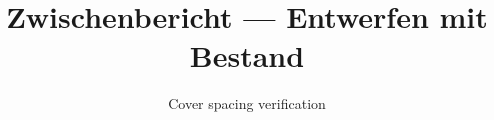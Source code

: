 \documentclass[type=zwischenbericht]{zukunftbau}
\title{Zwischenbericht --- Entwerfen mit Bestand}
\subtitle{Cover spacing verification}
\begin{document}
\makecoverpages
\end{document}
